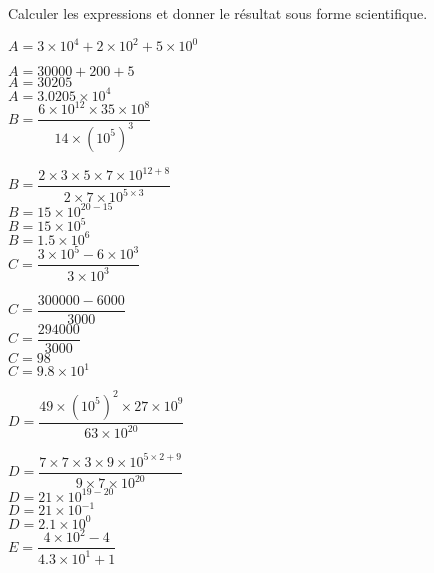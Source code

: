 \begin{corrige}
    Calculer les expressions et donner le résultat sous forme scientifique.
    \begin{spacing}{2}
        \begin{itemize}
            \def\item{}
            \item $A = 3\times 10^4 + 2\times 10^2 + 5\times 10^0$
            
            {\red
            $A = \num{30000} + 200 + 5$\\
            $A = \num{30205}$\\
            $A = \num{3.0205}\times 10^4$\\
            }
            \item $B=\dfrac{6\times 10^{12}\times 35 \times 10^8}{14\times \left(10^5\right)^3}$
            
            {\red
                $B=\dfrac{2\times 3\times 5\times 7\times 10^{12+8}}{2\times 7\times 10^{5\times 3}}$\\
                $B=15\times 10^{20-15}$\\
                $B=15\times 10^{5}$\\
                $B=\num{1.5}\times 10^{6}$\\
            }
            \item $C=\dfrac{3\times 10^{5} - 6 \times 10^3}{3\times 10^3}$
            
            {\red
                $C=\dfrac{\num{300000} - \num{6000}}{\num{3000}}$\\
                $C=\dfrac{\num{294000}}{\num{3000}}$\\
                $C=98$\\
                $C=\num{9.8}\times 10^1$\\
            }
        \end{itemize}
    \end{spacing}
    \Coupe
    \begin{spacing}{2}
        \begin{itemize}
            \def\item{}
            \item $D=\dfrac{49\times (10^{5})^2\times 27 \times 10^9}{63\times 10^{20}}$
            
            {\red
                $D=\dfrac{7\times 7\times 3\times 9 \times 10^{5\times 2 + 9}}{9\times 7\times 10^{20}}$\\
                $D=21\times 10^{19-20}$\\
                $D=21\times 10^{-1}$\\
                $D=\num{2.1}\times 10^{0}$\\
            }
            \item $E=\dfrac{4\times 10^{2} -4}{\num{4.3}\times 10^1 + 1}$
            

\end{itemize}
\end{spacing}
\end{corrige}
